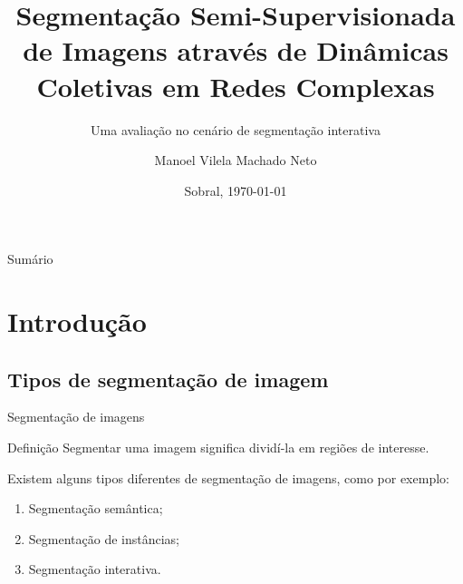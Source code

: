 \documentclass{templatebeamerufc/libs/ufc_format}
\title[EGSIS]{\textbf{Segmentação Semi-Supervisionada de Imagens através de
Dinâmicas Coletivas em Redes Complexas}}
\subtitle{Uma avaliação no cenário de segmentação interativa}
\author{Manoel Vilela Machado Neto}
\institute[UFC]{
    \normalsize{\email{manoel.machado@alu.ufc.br}}
    \newline
    \department{Engenharia da Computação}
    \newline
    \ufc{}
}
\date{Sobral, \today}
\begin{document}

\begin{frame}{}
    \maketitle
\end{frame}

\begin{frame}[allowframebreaks]{Sumário}
  \tableofcontents[sections={1-2}]
    \framebreak{}
  \tableofcontents[sections={3-5}]
\end{frame}

\section{Introdução}

\subsection{Tipos de segmentação de imagem}

\begin{frame}{Segmentação de imagens}
  \begin{block}{Definição}
    Segmentar uma imagem significa dividí-la em regiões de interesse.
  \end{block}

  Existem alguns tipos diferentes de segmentação de imagens, como por
exemplo:
  \begin{enumerate}
    \item Segmentação semântica;
    \item Segmentação de instâncias;
    \item Segmentação interativa.
  \end{enumerate}
\end{frame}
\end{document}
